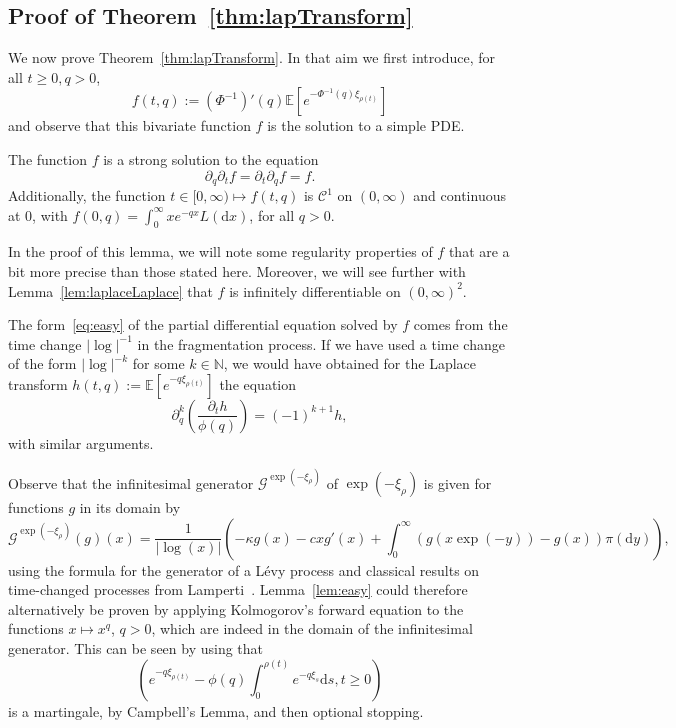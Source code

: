 \documentclass[AHL,Unicode,longabstracts,published]{cedram}
\newcommand{\N}{\mathbb{N}}
\newcommand{\bbE}{\mathbb{E}}
\newcommand{\dd}{\mathrm{d}}
\newcommand{\calC}{\mathcal{C}}
\newcommand{\calG}{\mathcal{G}}
\begin{document}
\subsection{Proof of Theorem~\ref{thm:lapTransform}}\label{sec:proofThmain}

We now prove Theorem~\ref{thm:lapTransform}. In that aim we first introduce, for all $t \geq 0, q>0$,
\begin{equation}\label{def:f}
f(t,q):=(\Phi^{-1})'(q)\bbE\left[e^{-\Phi^{-1}(q) \xi_{\rho(t)}}\right]
\end{equation}
and observe that this bivariate function $f$ is the solution to a simple PDE.

\begin{lemm}\label{lem:easy}
The function $f$ is a strong solution to the equation
\begin{equation}\label{eq:easy}
\partial_q \partial_t f = \partial_t \partial_q f= f.
\end{equation}
Additionally, the function $t \in [0,\infty) \mapsto f(t,q)$ is $\calC^1$ on $(0,\infty)$ and continuous at 0, with $f(0,q)=\int_0^{\infty}xe^{-qx}L(\dd x)$, for all $q>0$.
\end{lemm}

In the proof of this lemma, we will note some regularity properties of $f$ that are a bit more precise than those stated here. Moreover, we will see further with Lemma~\ref{lem:laplaceLaplace} that $f$ is infinitely differentiable on $(0,\infty)^2$.


\begin{rema}
The form~\eqref{eq:easy} of the partial differential equation solved by $f$ comes from the time change $|\log |^{-1}$ in the fragmentation process. If we have used a time change of the form $|\log |^{-k}$ for some $k \in \N$, we would have obtained for the Laplace transform $h(t,q):=\bbE[e^{-q \xi_{\rho(t)}}]$ the equation
\[
\partial_q^k \left(\frac{\partial_t h}{\phi(q)}\right)= (-1)^{k+1}h,
\]
with similar arguments.
\end{rema}


\begin{rema}\label{rem:gene}
Observe that the infinitesimal generator $\calG^{\exp(-\xi_{\rho})}$ of $\exp(-\xi_{\rho})$ is given for functions $g$ in its domain by
\begin{equation*}\label{generator}
\calG^{\exp(-\xi_{\rho})}(g)(x)=\frac{1}{\left|\log(x)\right|}\left(-\kappa g(x)-cxg'(x)+\int_0^{\infty} \left(g(x\exp(-y))-g(x)\right) \pi (\dd y)\right),
\end{equation*}
using the formula for the generator of a Lévy process and classical results on time-changed processes from Lamperti~\cite{Lamp67}. Lemma~\ref{lem:easy} could therefore alternatively be proven by applying Kolmogorov's forward equation to the functions $x \mapsto x^{q}$, $q > 0$, which are indeed in the domain of the infinitesimal generator. This can be seen by using that
\[
\left(e^{-q \xi_{\rho(t)}} - \phi(q)\int_0^{\rho(t)} e^{-q \xi_s} \dd s, t \geq 0\right)
\]
is a martingale, by Campbell's Lemma, and then optional stopping.
\end{rema}
\end{document}
